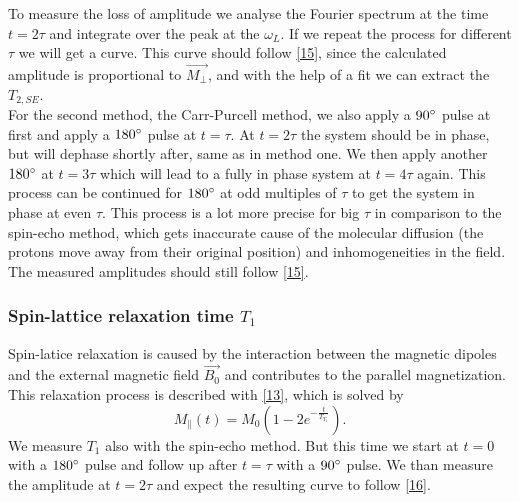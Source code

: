 To measure the loss of amplitude we analyse the Fourier spectrum at the time $t=2\tau$ and integrate over the peak at the $\omega_L$. If we repeat the process for different $\tau$ we will get a curve. This curve should follow \eqref{15}, since the calculated amplitude is proportional to $\vec{M_{\perp}}$, and with the help of a fit we can extract the $T_{2,SE}$.
\vspace{3mm} \\
For the second method, the Carr-Purcell method, we also apply a $90\degree$ pulse at first and apply a $180\degree$ pulse at $t=\tau$. At $t=2\tau$ the system should be in phase, but will dephase shortly after, same as in method one. We then apply another $180\degree$ at $t=3\tau$ which will lead to a fully in phase system at $t=4\tau$ again. This process can be continued for $180\degree$ at odd multiples of $\tau$ to get the system in phase at even $\tau$. This process is a lot more precise for big $\tau$ in comparison to the spin-echo method, which gets inaccurate cause of the molecular diffusion (the protons move away from their original position) and inhomogeneities in the field.\\
The measured amplitudes should still follow \eqref{15}.
\subsubsection{Spin-lattice relaxation time $T_{1}$}
Spin-latice relaxation is caused by the interaction between the magnetic dipoles and the external magnetic field $\vec{B_0}$ and contributes to the parallel magnetization. This relaxation process is described with \eqref{13}, which is solved by
\begin{equation}
	\label{16}
	M_{\parallel}(t) = M_{0}(1-2e^{-\frac{t}{T_{T_{1}}}}).
\end{equation}
We measure $T_1$ also with the spin-echo method. But this time we start at $t=0$ with a $180\degree$ pulse and follow up after $t=\tau$ with a $90\degree$ pulse. We than measure the amplitude at $t=2\tau$ and expect the resulting curve to follow \eqref{16}.
